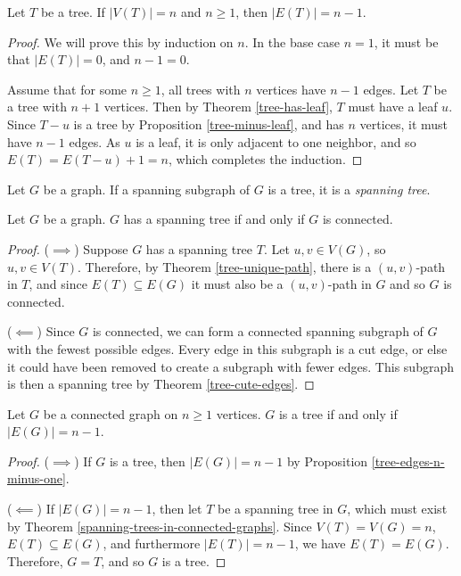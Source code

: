 \begin{prop}\label{tree-edges-n-minus-one}
    Let $T$ be a tree. If $|V(T)| = n$ and $n \geq 1$, then $|E(T)| = n-1$.
\end{prop}

\begin{proof}
    We will prove this by induction on $n$. In the base case $n=1$, it must be that $|E(T)| = 0$, and $n-1 = 0$.

    Assume that for some $n \geq 1$, all trees with $n$ vertices have $n-1$ edges. Let $T$ be a tree with $n+1$ vertices. Then by Theorem \ref{tree-has-leaf}, $T$ must have a leaf $u$. Since $T - u$ is a tree by Proposition \ref{tree-minus-leaf}, and has $n$ vertices, it must have $n-1$ edges. As $u$ is a leaf, it is only adjacent to one neighbor, and so $E(T) = E(T - u) + 1 = n$, which completes the induction.
\end{proof}

\begin{defn}
    Let $G$ be a graph. If a spanning subgraph of $G$ is a tree, it is a \emph{spanning tree}.
\end{defn}

\begin{thm}\label{spanning-trees-in-connected-graphs}
    Let $G$ be a graph. $G$ has a spanning tree if and only if $G$ is connected.
\end{thm}

\begin{proof}\proofbreak
    ($\implies$) Suppose $G$ has a spanning tree $T$. Let $u, v \in V(G)$, so $u, v \in V(T)$. Therefore, by Theorem \ref{tree-unique-path}, there is a $(u,v)$-path in $T$, and since $E(T) \subseteq E(G)$ it must also be a $(u,v)$-path in $G$ and so $G$ is connected.

    ($\impliedby$) Since $G$ is connected, we can form a connected spanning subgraph of $G$ with the fewest possible edges. Every edge in this subgraph is a cut edge, or else it could have been removed to create a subgraph with fewer edges. This subgraph is then a spanning tree by Theorem \ref{tree-cute-edges}.
\end{proof}

\begin{thm}\label{tree-edges-iff}
    Let $G$ be a connected graph on $n \geq 1$ vertices. $G$ is a tree if and only if $|E(G)| = n-1$.
\end{thm}

\begin{proof}\proofbreak
    ($\implies$) If $G$ is a tree, then $|E(G)| = n-1$ by Proposition \ref{tree-edges-n-minus-one}.

    ($\impliedby$) If $|E(G)| = n-1$, then let $T$ be a spanning tree in $G$, which must exist by Theorem \ref{spanning-trees-in-connected-graphs}. Since $V(T) = V(G) = n$, $E(T) \subseteq E(G)$, and furthermore $|E(T)| = n-1$, we have $E(T) = E(G)$. Therefore, $G = T$, and so $G$ is a tree.
\end{proof}

